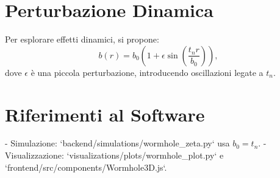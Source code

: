 \documentclass[11pt]{article}
\begin{document}
\section{Perturbazione Dinamica}
Per esplorare effetti dinamici, si propone:
\begin{equation}
b(r) = b_0 \left( 1 + \epsilon \sin\left( \frac{t_n r}{b_0} \right) \right),
\label{eq:dynamic}
\end{equation}
dove \( \epsilon \) è una piccola perturbazione, introducendo oscillazioni legate a \( t_n \).

\section{Riferimenti al Software}
- Simulazione: `backend/simulations/wormhole_zeta.py` usa \( b_0 = t_n \).
- Visualizzazione: `visualizations/plots/wormhole_plot.py` e `frontend/src/components/Wormhole3D.js`.
\end{document}
